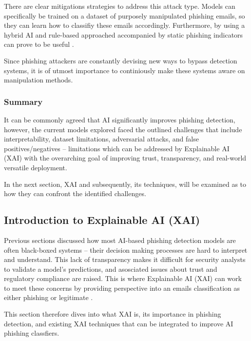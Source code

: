 \noindent There are clear mitigations strategies to address this attack type. Models can specifically be trained on a dataset of purposely manipulated phishing emails, so they can learn how to classifiy these emails accordingly. Furthermore, by using a hybrid AI and rule-based approached accompanied by static phishing indicators can prove to be useful \citep{hadi2024adaptive}.\newline

\noindent Since phishing attackers are constantly devising new ways to bypass detection systems, it is of utmost importance to continiously make these systems aware on manipulation methods.

\subsubsection*{Summary}
It can be commonly agreed that AI significantly improves phishing detection, however, the current models explored faced the outlined challenges that include interpretability, dataset limitations, adversarial attacks, and false positives/negatives -- limitations which can be addressed by Explainable AI (XAI) with the overarching goal of improving trust, transparency, and real-world versatile deployment.\newline

\noindent In the next section, XAI and subsequently, its techniques, will be examined as to how they can confront the identified challenges.

\newpage

\subsection*{Introduction to Explainable AI (XAI)}
Previous sections discussed how most AI-based phishing detection models are often black-boxed systems -- their decision making processes are hard to interpret and understand. This lack of transparency makes it difficult for security analysts to validate a model's predictions, and asosciated issues about trust and regulatory compliance are raised. This is where Explainable AI (XAI) can work to meet these concerns by providing perspective into an emails classification as either phishing or legitimate \citep{doshi2017towards}.\newline

\noindent This section therefore dives into what XAI is, its importance in phishing detection, and existing XAI techniques that can be integrated to improve AI phishing classfiers.

